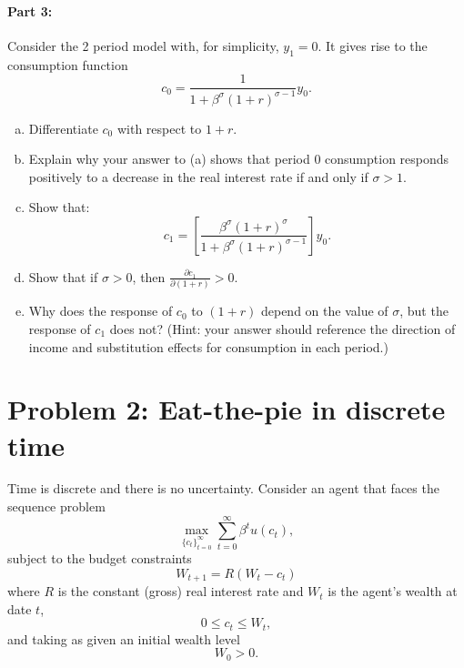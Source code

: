\documentclass[11pt]{extarticle}
\theoremstyle{plain}
\theoremstyle{definition}
\begin{document}
\paragraph{Part 3:}
Consider the 2 period model with, for simplicity, $y_1 = 0$. It gives rise to the consumption function 
\begin{equation*}
	c_0=\frac{1}{1+\beta^\sigma(1+r)^{\sigma-1}} y_0 .
\end{equation*}

\begin{enumerate}[(a)]
\item Differentiate $c_0$ with respect to $1+r$.

\item Explain why your answer to (a) shows that period 0 consumption responds positively to a decrease in the real interest rate if and only if $\sigma>1$. 

\item  Show that:
\begin{equation*}
	c_1=\left[\frac{\beta^\sigma(1+r)^\sigma}{1+\beta^\sigma(1+r)^{\sigma-1}}\right] y_0 .
\end{equation*}

\item Show that if $\sigma>0$, then $\frac{\partial c_1}{\partial(1+r)}>0$.

\item Why does the response of $c_0$ to $(1+r)$ depend on the value of $\sigma$, but the response of $c_1$ does not? (Hint: your answer should reference the direction of income and substitution effects for consumption in each period.)
\end{enumerate}



\vspace{5mm}
\section*{Problem 2: Eat-the-pie in discrete time} 

Time is discrete and there is no uncertainty. Consider an agent that faces the sequence problem 
\begin{equation*}
	\max_{\{c_t\}_{t=0}^\infty} \sum_{t=0}^\infty \beta^t u(c_t),
\end{equation*}
subject to the budget constraints
\begin{equation*}
	W_{t+1} = R(W_t - c_t)
\end{equation*}
where $R$ is the constant (gross) real interest rate and $W_t$ is the agent's wealth at date $t$,
\begin{equation*}
	0 \leq c_t \leq W_t,
\end{equation*}
and taking as given an initial wealth level 
\begin{equation*}
	W_0 > 0.
\end{equation*}
\end{document}
